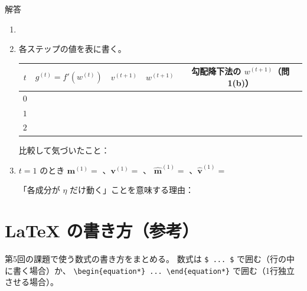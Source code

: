 \documentclass[a4paper,dvipdfmx]{jsarticle}
\newcommand{\提出期限}{2026年10月26日（月）}
\newcommand{\学籍番号}{0000000}
\newcommand{\氏名}{氏名を書く}
\newcommand{\提出日}{2026年10月26日}
\newenvironment{answer}{\begin{itembox}[l]{解答}}{\end{itembox}}
\begin{document}
\begin{enumerate}
\begin{answer}
\begin{enumerate}
\begin{equation*}
          \end{equation*}
          $\beta = 0.9$ のとき実効的な学習率は \phantom{XX} 倍。
        \item \mbox{}
          \vspace{22mm}
        \item 各ステップの値を表に書く。
          \begin{center}
            \begin{tabular}{c|c|c|c|c}
              \hline
              $t$ & $g^{(t)} = f'(w^{(t)})$ & $v^{(t+1)}$ & $w^{(t+1)}$ & 勾配降下法の $w^{(t+1)}$（問1(b)） \\
              \hline
              $0$ & & & & \\
              $1$ & & & & \\
              $2$ & & & & \\
              \hline
            \end{tabular}
          \end{center}
          比較して気づいたこと：
          \vspace{10mm}
        \item $t = 1$ のとき $\bm{m}^{(1)} = $ \phantom{XXXXXX}、$\bm{v}^{(1)} = $ \phantom{XXXXXX}、
          $\hat{\bm{m}}^{(1)} = $ \phantom{XXXX}、$\hat{\bm{v}}^{(1)} = $ \phantom{XXXXXX}
          \vspace{14mm}

          「各成分が $\eta$ だけ動く」ことを意味する理由：
          \vspace{12mm}
      \end{enumerate}
    \end{answer}

\end{enumerate}

\newpage
\section*{LaTeX の書き方（参考）}

第5回の課題で使う数式の書き方をまとめる。
数式は \verb|$ ... $| で囲む（行の中に書く場合）か、
\verb|\begin{equation*} ... \end{equation*}| で囲む（1行独立させる場合）。
\end{document}
